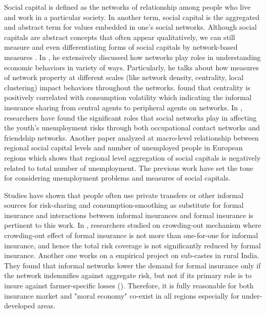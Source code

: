 \documentclass{article}
\begin{document}
Social capital is defined as the networks of relationship among people who live and work in a particular society. In another term, social capital is the aggregated and abstract term for values embedded in one's social networks. Although social capitals are abstract concepts that often appear qualitatively, we can still measure and even differentiating forms of social capitals by network-based measures \cite{Jackson2020}.
In \cite{jackson2014networks}, he extensively discussed how networks play roles in understanding economic behaviors in variety of ways. Particularly, he talks about how measures of network property at different scales (like network density, centrality, local clustering) impact behaviors throughout the networks. \cite{informalshare_local} found that centrality is positively correlated with consumption volatility which indicating the informal insurance sharing from central agents to peripheral agents on networks. In \cite{hallsten2017social}, researchers have found the significant roles that social networks play in affecting the youth's unemployment risks through both occupational contact networks and friendship networks. Another paper \cite{freitag2011social} analyzed at macro-level relationship between regional social capital levels and number of unemployed people in European regions which shows that regional level aggregation of social capitals is negatively related to total number of unemployment. The previous work have set the tone for considering unemployment problems and measures of social capitals.

Studies have shown that people often use private transfers or other informal sources for risk-sharing and consumption-smoothing as substitute for formal insurance \cite{ligon2002informal}
\cite{rosenzweig1988risk} and interactions between informal insurances and formal insurance is pertinent to this work. In \cite{modelofcrowdingout}, researchers studied on crowding-out mechanism where crowding-out effect of formal insurance is not more than one-for-one for informal insurance, and hence the total risk coverage is not significantly reduced by formal insurance.
Another one works on a empirical project on sub-castes in rural India. They found that informal networks lower the demand for formal insurance only if the network indemnifies against aggregate risk, but not if its primary role is to insure
against farmer-specific losses (\cite{mobarak2012selling}). Therefore, it is fully reasonable for both insurance market and "moral economy" co-exist in all regions especially for under-developed areas.
\end{document}
